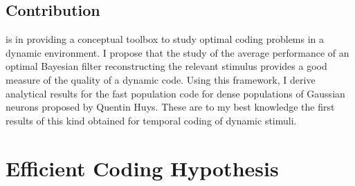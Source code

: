 \subsection*{Contribution}
 is in providing a conceptual toolbox to study optimal coding problems in a dynamic environment. I propose that the study of the average performance of an optimal Bayesian filter reconstructing the relevant stimulus provides a good measure of the quality of a dynamic code. Using this framework, I derive analytical results for the fast population code for dense populations of Gaussian neurons proposed by Quentin Huys.\cite{Huys2007} These are to my best knowledge the first results of this kind obtained for temporal coding of dynamic stimuli.

\section{Efficient Coding Hypothesis}

